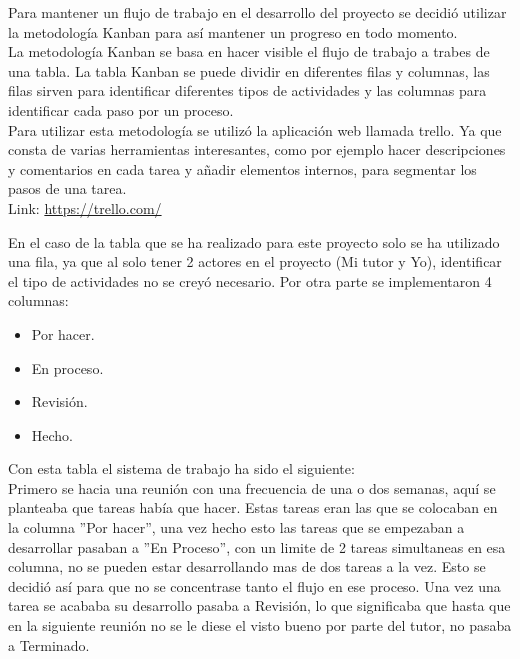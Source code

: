 Para mantener un flujo de trabajo en el desarrollo del proyecto se decidió utilizar la metodología Kanban\cite{Kanban} para así mantener un  progreso en todo momento.\\


La metodología Kanban se basa en hacer visible el flujo de trabajo a trabes de una tabla.
La tabla Kanban se puede dividir en diferentes filas y columnas, las filas sirven para identificar diferentes tipos de actividades y las columnas para identificar cada paso por un proceso.\\

Para utilizar esta metodología se utilizó la aplicación web llamada trello. Ya que consta de varias herramientas interesantes, como por ejemplo hacer descripciones y comentarios en cada tarea y añadir elementos internos, para segmentar los pasos de una tarea.\\

Link: \url{https://trello.com/}

En el caso de la tabla que se ha realizado para este proyecto solo se ha utilizado una fila, ya que al solo tener 2 actores en el proyecto (Mi tutor y Yo), identificar el tipo de actividades no se creyó necesario. Por otra parte se implementaron 4 columnas:

\begin{itemize}
	\item Por hacer.
	\item En proceso.
	\item Revisión.
	\item Hecho.
\end{itemize}




Con esta tabla el sistema de trabajo ha sido el siguiente:\\

Primero se hacia una reunión con una frecuencia de una o dos semanas, aquí se planteaba que tareas había que hacer. Estas tareas eran las que se colocaban en la columna ''Por hacer'', una vez hecho esto las tareas que  se empezaban a desarrollar pasaban a ''En Proceso'', con un limite de 2 tareas simultaneas en esa columna, no se pueden estar desarrollando mas de dos tareas a la vez. Esto se decidió así para que no se concentrase tanto el flujo en ese proceso. Una vez una tarea se acababa su desarrollo pasaba a Revisión, lo que significaba que hasta que en la siguiente reunión no se le diese el visto bueno por parte del tutor, no pasaba a Terminado.


